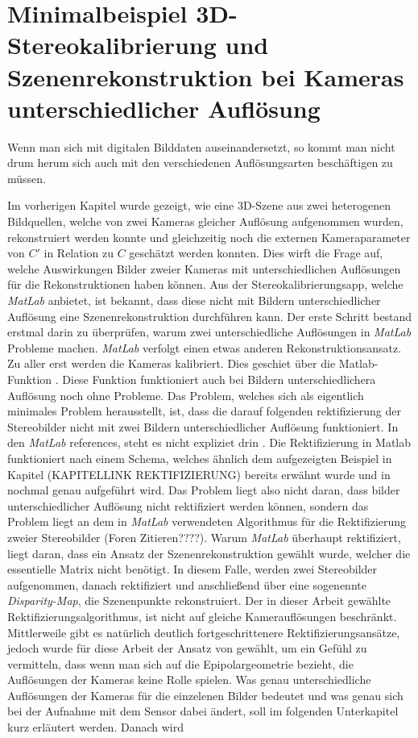\chapter{Minimalbeispiel 3D-Stereokalibrierung und Szenenrekonstruktion bei Kameras unterschiedlicher Auflösung}

Wenn man sich mit digitalen Bilddaten auseinandersetzt, so kommt man nicht drum herum sich auch mit den  verschiedenen Auflösungsarten beschäftigen zu müssen.

Im vorherigen Kapitel wurde gezeigt, wie eine 3D-Szene aus zwei heterogenen Bildquellen, welche von zwei Kameras gleicher Auflösung aufgenommen wurden, rekonstruiert werden konnte und gleichzeitig noch die externen Kameraparameter von $C'$ in Relation zu $C$ geschätzt werden konnten. Dies wirft die Frage auf, welche Auswirkungen Bilder zweier Kameras mit unterschiedlichen Auflösungen für die Rekonstruktionen haben können. Aus der Stereokalibrierungsapp, welche \textit{MatLab} anbietet, ist bekannt, dass diese nicht mit Bildern unterschiedlicher Auflösung eine Szenenrekonstruktion durchführen kann. Der erste Schritt bestand erstmal darin zu überprüfen, warum zwei unterschiedliche Auflösungen in \textit{MatLab} Probleme machen. \textit{MatLab} verfolgt einen etwas anderen Rekonstruktionsansatz. Zu aller erst werden die Kameras kalibriert. Dies geschiet über die Matlab-Funktion \cite{MatlabCamParam}. Diese Funktion funktioniert auch bei Bildern unterschiedlichera Auflösung noch ohne Probleme. Das Problem, welches sich als eigentlich minimales Problem herausstellt, ist, dass die darauf folgenden rektifizierung der Stereobilder nicht mit zwei Bildern unterschiedlicher Auflösung funktioniert. In den \textit{MatLab} references, steht es nicht expliziet drin \cite{MatlabRec}. Die Rektifizierung in Matlab funktioniert nach einem Schema, welches ähnlich dem aufgezeigten Beispiel in Kapitel (KAPITELLINK REKTIFIZIERUNG) bereits erwähnt wurde und in \cite{Fusiello,FusielloSite} nochmal genau aufgeführt wird. Das Problem liegt also nicht daran, dass bilder unterschiedlicher Auflösung nicht rektifiziert werden können, sondern das Problem liegt an dem in \textit{MatLab} verwendeten Algorithmus für die Rektifizierung zweier Stereobilder (Foren Zitieren????). Warum \textit{MatLab} überhaupt rektifiziert, liegt daran, dass ein Ansatz der Szenenrekonstruktion gewählt wurde, welcher die essentielle Matrix nicht benötigt. In diesem Falle, werden zwei Stereobilder aufgenommen, danach rektifiziert und anschließend über eine sogenennte \textit{Disparity-Map}, die Szenenpunkte rekonstruiert\cite{MatlabDisp,MatlabStereoApp,Fusiello,Javier}. Der in dieser Arbeit gewählte Rektifizierungsalgorithmus, ist nicht auf gleiche Kamerauflösungen beschränkt. Mittlerweile gibt es natürlich deutlich fortgeschrittenere Rektifizierungsansätze, jedoch wurde für diese Arbeit der Ansatz von \cite{ZZ} gewählt, um ein Gefühl zu vermitteln, dass wenn man sich auf die Epipolargeometrie bezieht, die Auflösungen der Kameras keine Rolle spielen\cite{Elements}. Was genau unterschiedliche Auflösungen der Kameras für die einzelenen Bilder bedeutet und was genau sich bei der Aufnahme mit dem Sensor dabei ändert, soll im folgenden Unterkapitel kurz erläutert werden. Danach wird 